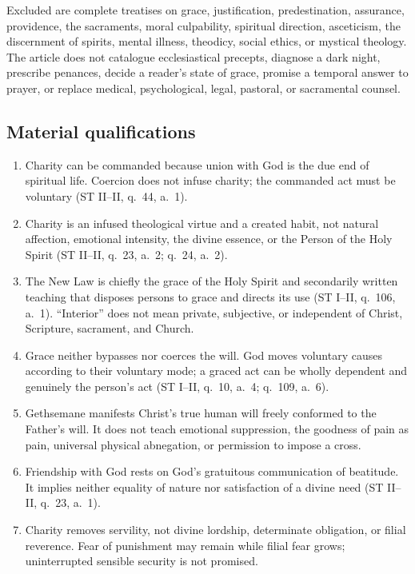 Excluded are complete treatises on grace, justification, predestination, assurance, providence, the sacraments, moral culpability, spiritual direction, asceticism, the discernment of spirits, mental illness, theodicy, social ethics, or mystical theology. The article does not catalogue ecclesiastical precepts, diagnose a dark night, prescribe penances, decide a reader's state of grace, promise a temporal answer to prayer, or replace medical, psychological, legal, pastoral, or sacramental counsel.

\subsection{Material qualifications}

\begin{enumerate}[leftmargin=1.45em,itemsep=0.25em]
\item Charity can be commanded because union with God is the due end of spiritual life. Coercion does not infuse charity; the commanded act must be voluntary (ST II--II, q.~44, a.~1).
\item Charity is an infused theological virtue and a created habit, not natural affection, emotional intensity, the divine essence, or the Person of the Holy Spirit (ST II--II, q.~23, a.~2; q.~24, a.~2).
\item The New Law is chiefly the grace of the Holy Spirit and secondarily written teaching that disposes persons to grace and directs its use (ST I--II, q.~106, a.~1). ``Interior'' does not mean private, subjective, or independent of Christ, Scripture, sacrament, and Church.
\item Grace neither bypasses nor coerces the will. God moves voluntary causes according to their voluntary mode; a graced act can be wholly dependent and genuinely the person's act (ST I--II, q.~10, a.~4; q.~109, a.~6).
\item Gethsemane manifests Christ's true human will freely conformed to the Father's will. It does not teach emotional suppression, the goodness of pain as pain, universal physical abnegation, or permission to impose a cross.
\item Friendship with God rests on God's gratuitous communication of beatitude. It implies neither equality of nature nor satisfaction of a divine need (ST II--II, q.~23, a.~1).
\item Charity removes servility, not divine lordship, determinate obligation, or filial reverence. Fear of punishment may remain while filial fear grows; uninterrupted sensible security is not promised.

\end{enumerate}
